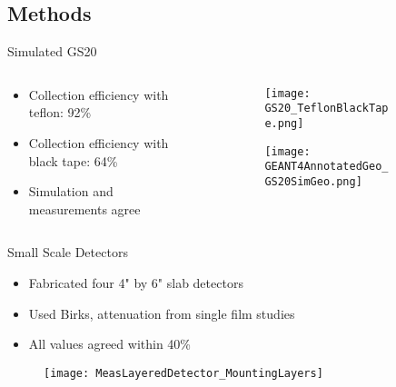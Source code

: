 \subsection{Methods}
\begin{frame}{Simulated GS20}
  \begin{columns}[onlytextwidth]
    \begin{column}{0.55\textwidth}
      \begin{itemize}
        \item Collection efficiency with teflon: 92\%
        \item Collection efficiency with black tape: 64\%
        \item Simulation and measurements agree
      \end{itemize}
    \end{column}
    \begin{column}{0.4\textwidth}
      \begin{figure}
        \vspace*{-1cm}
        \begin{subfigure}[b]{\textwidth}
        \texttt{[image: GS20\_TeflonBlackTape.png]}
        \end{subfigure}
        
        \begin{subfigure}[b]{\textwidth}
        \texttt{[image: GEANT4AnnotatedGeo\_GS20SimGeo.png]}
        \end{subfigure}
      \end{figure}
    \end{column}
  \end{columns}
\end{frame}
\begin{frame}{Small Scale Detectors}
\begin{itemize}
  \item Fabricated four 4" by 6" slab detectors
  \item Used Birks, attenuation from single film studies
  \item All values agreed within 40\%
\end{itemize}
\begin{figure}
	\centering
	\texttt{[image: MeasLayeredDetector\_MountingLayers]}
\end{figure}
\end{frame}
